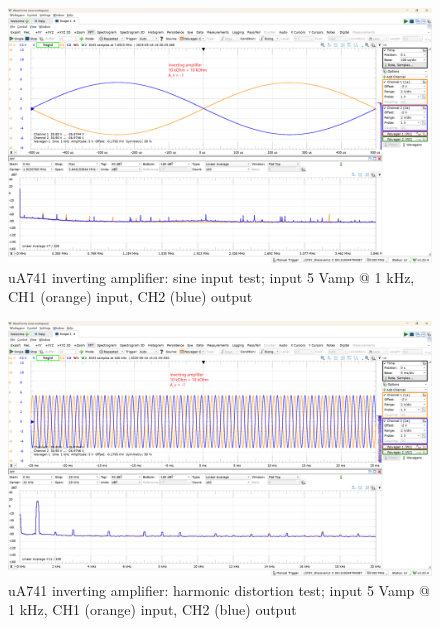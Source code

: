 \documentclass[UTF8]{article}
\begin{document}
\begin{figure}[H]\centering
    \includegraphics[width=\columnwidth]{LCE-06-07-运放设计/assets/uA741/test/inverting 1.png}
    \caption{uA741 inverting amplifier: sine input test; input 5 Vamp @ 1 kHz, CH1 (orange) input, CH2 (blue) output}
\end{figure}

\begin{figure}[H]\centering
    \includegraphics[width=\columnwidth]{LCE-06-07-运放设计/assets/uA741/test/inverting 2.png}
    \caption{uA741 inverting amplifier: harmonic distortion test; input 5 Vamp @ 1 kHz, CH1 (orange) input, CH2 (blue) output}
\end{figure}
\end{document}
